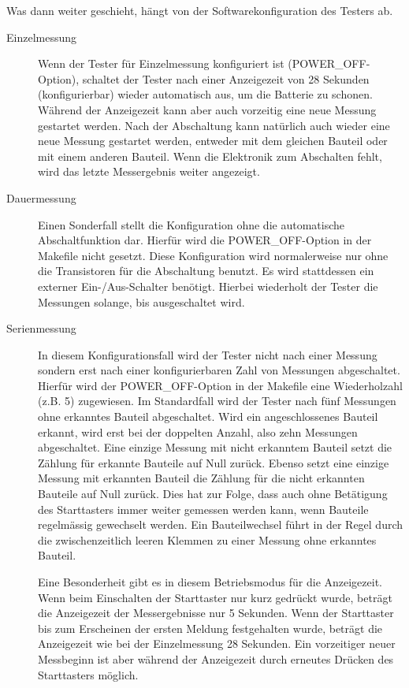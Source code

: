 Was dann weiter geschieht, hängt von der Softwarekonfiguration des Testers ab.
\begin{description}
  \item[Einzelmessung] Wenn der Tester für Einzelmessung konfiguriert ist (POWER\_OFF-Option),
 schaltet der Tester nach einer Anzeigezeit
von 28 Sekunden (konfigurierbar) wieder automatisch aus, um die Batterie zu schonen.
Während der Anzeigezeit kann aber auch vorzeitig eine neue Messung gestartet werden.
Nach der Abschaltung kann natürlich auch wieder eine
neue Messung gestartet werden, entweder mit dem gleichen Bauteil oder mit einem anderen Bauteil.
Wenn die Elektronik zum Abschalten fehlt, wird das letzte Messergebnis weiter angezeigt.

  \item[Dauermessung] Einen Sonderfall stellt die Konfiguration ohne die automatische Abschaltfunktion dar.
Hierfür wird die POWER\_OFF-Option in der Makefile nicht gesetzt.
Diese Konfiguration wird normalerweise nur ohne die Transistoren für die Abschaltung benutzt.
Es wird stattdessen ein externer Ein-/Aus-Schalter benötigt. Hierbei wiederholt der Tester die
Messungen solange, bis ausgeschaltet wird.

  \item[Serienmessung] In diesem Konfigurationsfall wird der Tester nicht nach einer Messung sondern erst nach einer konfigurierbaren
Zahl von Messungen abgeschaltet. Hierfür wird der POWER\_OFF-Option in der Makefile eine Wiederholzahl (z.B. 5) zugewiesen.
Im Standardfall wird der Tester nach fünf Messungen ohne erkanntes Bauteil abgeschaltet.
Wird ein angeschlossenes Bauteil erkannt, wird erst bei der doppelten Anzahl, also zehn Messungen abgeschaltet.
Eine einzige Messung mit nicht erkanntem Bauteil setzt die Zählung für erkannte Bauteile auf Null zurück.
Ebenso setzt eine einzige Messung mit erkannten Bauteil die Zählung für die nicht erkannten Bauteile auf Null zurück.
Dies hat zur Folge, dass auch ohne Betätigung des Starttasters immer weiter gemessen werden kann,
 wenn Bauteile regelmässig gewechselt werden.
Ein Bauteilwechsel führt in der Regel durch die zwischenzeitlich leeren Klemmen zu einer Messung ohne erkanntes Bauteil.

Eine Besonderheit gibt es in diesem Betriebsmodus für die Anzeigezeit. Wenn beim Einschalten der Starttaster nur kurz
gedrückt wurde, beträgt die Anzeigezeit der Messergebnisse nur 5 Sekunden. Wenn der Starttaster bis zum Erscheinen der
ersten Meldung festgehalten wurde, beträgt die Anzeigezeit wie bei der Einzelmessung 28 Sekunden.
Ein vorzeitiger neuer Messbeginn ist aber während der Anzeigezeit durch erneutes Drücken des Starttasters möglich.

\end{description}

